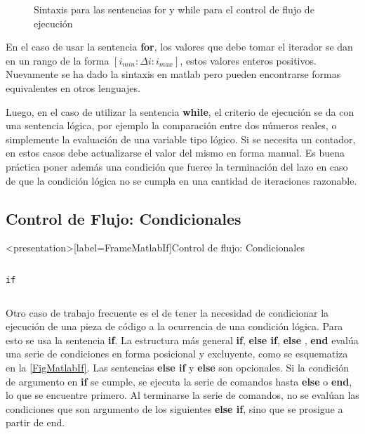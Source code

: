 \begin{figure}
  \caption{
    Sintaxis para las sentencias for y while
  para el control de flujo de ejecución \label{FigMatlabForWhile}
}
\end{figure}

En el caso de usar la sentencia \textbf{for}, los valores que debe tomar
el iterador se dan en un rango de la forma  $[ i_{min} :  \Delta i : i_{max} ]$, 
estos valores enteros positivos. Nuevamente se ha dado la sintaxis en matlab
pero pueden encontrarse formas equivalentes en otros lenguajes. 

Luego, en el caso de utilizar la sentencia \textbf{while}, el criterio 
de ejecución se da con una sentencia lógica, por ejemplo la comparación
entre dos números reales, o simplemente la evaluación de una 
variable tipo lógico. Si se necesita un contador, en estos casos
debe actualizarse el valor del mismo en forma manual. Es buena
práctica poner además una condición que fuerce la terminación  
del lazo en caso de que la condición lógica no se cumpla 
en una cantidad de iteraciones razonable. 

\mode*

\subsection{Control de Flujo: Condicionales}

\begin{frame}<presentation>[label=FrameMatlabIf]{Control de flujo: Condicionales} 
\begin{columns}[T]
\hfill \large\texttt{if}

\begin{codeblock}

\end{codeblock}

\begin{codeblock}

\end{codeblock}

\end{columns}
\end{frame}


Otro caso de trabajo frecuente es el de tener 
la necesidad de condicionar la ejecución de 
una pieza de código a la ocurrencia de una 
condición lógica. Para esto se usa la sentencia
\textbf{if}. La estructura más general \textbf{if},
\textbf{else if}, \textbf{else} , \textbf{end} evalúa
una serie de condiciones en forma posicional  y 
excluyente, como se esquematiza en la 
\autoref{FigMatlabIf}. Las sentencias \textbf{else if} y 
\textbf{else} son opcionales. Si la condición 
de argumento en \textbf{if} se cumple, se ejecuta
la serie de comandos hasta \textbf{else} o 
\textbf{end}, lo que se encuentre primero. Al 
terminarse la serie de comandos, no se evalúan 
las condiciones que son argumento de los 
siguientes \textbf{else if}, sino que se
prosigue a partir de end. 

